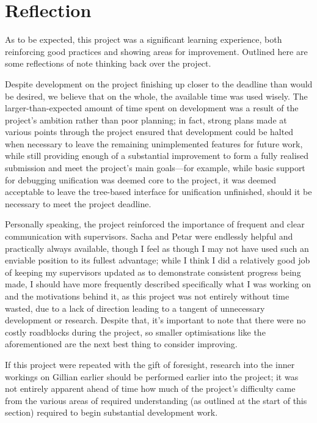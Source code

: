 \section{Reflection}

As to be expected, this project was a significant learning experience, both
reinforcing good practices and showing areas for improvement. Outlined here are
some reflections of note thinking back over the project.

Despite development on the project finishing up closer to the deadline than
would be desired, we believe that on the whole, the available time was used
wisely. The larger-than-expected amount of time spent on development was a
result of the project's ambition rather than poor planning; in fact, strong
plans made at various points through the project ensured that development could
be halted when necessary to leave the remaining unimplemented features for
future work, while still providing enough of a substantial improvement to form
a fully realised submission and meet the project's main goals---for example,
while basic support for debugging unification was deemed core to the project,
it was deemed acceptable to leave the tree-based interface for unification
unfinished, should it be necessary to meet the project deadline.

Personally speaking, the project reinforced the importance of frequent and clear
communication with supervisors. Sacha and Petar were endlessly helpful and
practically always available, though I feel as though I may not have used such
an enviable position to its fullest advantage; while I think I did a relatively
good job of keeping my supervisors updated as to demonstrate consistent progress
being made, I should have more frequently described specifically what I was
working on and the motivations behind it, as this project was not entirely
without time wasted, due to a lack of direction leading to a tangent of
unnecessary development or research. Despite that, it's important to note that
there were no costly roadblocks during the project, so smaller optimisations
like the aforementioned are the next best thing to consider improving.

If this project were repeated with the gift of foresight, research into the
inner workings on Gillian earlier should be performed earlier into the project;
it was not entirely apparent ahead of time how much of the project's difficulty
came from the various areas of required understanding (as outlined at the start
of this section) required to begin substantial development work.
